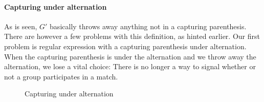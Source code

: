 \paragraph{Capturing under alternation}
As is seen, $G'$ basically throws away anything not in a capturing
parenthesis. There are however a few problems with this definition, as
hinted earlier. Our first problem is regular expression with a
capturing parenthesis under alternation. When the capturing
parenthesis is under the alternation and we throw away the
alternation, we lose a vital choice: There is no longer a way to
signal whether or not a group participates in a match.
\begin{figure}
  \centering
\caption{Capturing under alternation}
\end{figure}

